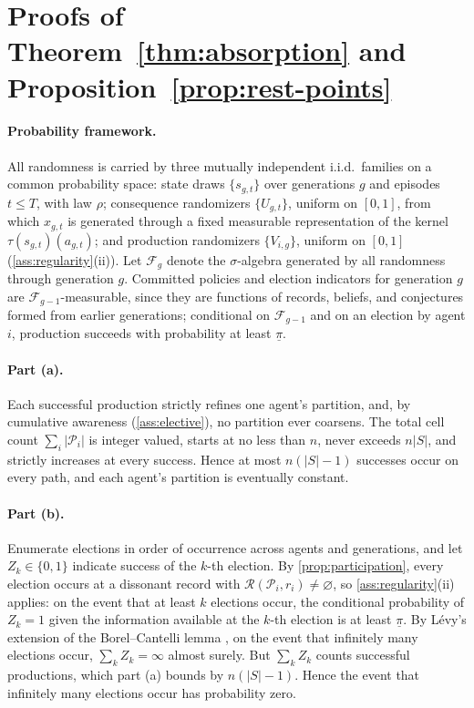 \documentclass[11pt]{article}
\theoremstyle{definition}
\newcommand{\emptysetset}{\varnothing}
\begin{document}



\appendix
\section{Proofs of Theorem~\ref{thm:absorption} and
Proposition~\ref{prop:rest-points}}
\label{app:absorption}

\paragraph{Probability framework.}
All randomness is carried by three mutually independent i.i.d.\ families on
a common probability space: state draws $\{s_{g,t}\}$ over generations $g$
and episodes $t\leq T$, with law $\rho$; consequence randomizers
$\{U_{g,t}\}$, uniform on $[0,1]$, from which $x_{g,t}$ is generated through
a fixed measurable representation of the kernel
$\tau(s_{g,t})(a_{g,t})$; and production randomizers $\{V_{i,g}\}$, uniform
on $[0,1]$ (\cref{ass:regularity}(ii)).  Let $\mathcal F_g$ denote the
$\sigma$-algebra generated by all randomness through generation $g$.
Committed policies and election indicators for generation $g$ are
$\mathcal F_{g-1}$-measurable, since they are functions of records, beliefs,
and conjectures formed from earlier generations; conditional on
$\mathcal F_{g-1}$ and on an election by agent $i$, production succeeds with
probability at least $\underline\pi$.

\paragraph{Part (a).}
Each successful production strictly refines one agent's partition, and, by
cumulative awareness (\cref{ass:elective}), no partition ever coarsens.  The
total cell count $\sum_i\lvert\mathcal P_i\rvert$ is integer valued, starts
at no less than $n$, never exceeds $n\lvert S\rvert$, and strictly increases
at every success.  Hence at most $n(\lvert S\rvert-1)$ successes occur on
every path, and each agent's partition is eventually constant.

\paragraph{Part (b).}
Enumerate elections in order of occurrence across agents and generations,
and let $Z_k\in\{0,1\}$ indicate success of the $k$-th election.  By
\cref{prop:participation}, every election occurs at a dissonant record with
$\mathcal R(\mathcal P_i,r_i)\neq\emptysetset$, so \cref{ass:regularity}(ii)
applies: on the event that at least $k$ elections occur, the conditional
probability of $Z_k=1$ given the information available at the $k$-th
election is at least $\underline\pi$.  By L\'evy's extension of
the Borel--Cantelli lemma \citep[Thm.~12.15]{Williams1991}, on the event
that infinitely many elections occur, $\sum_kZ_k=\infty$ almost surely.
But $\sum_kZ_k$ counts successful productions, which part (a) bounds by
$n(\lvert S\rvert-1)$.  Hence the event that infinitely many elections
occur has probability zero.
\end{document}
